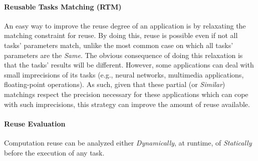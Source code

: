 
\paragraph{Reusable Tasks Matching (RTM)}

An easy way to improve the reuse degree of an application is by relaxating the matching constraint for reuse. By doing this, reuse is possible even if not all tasks' parameters match, unlike the most common case on which all tasks' parameters are the {\it Same}. The obvious consequence of doing this relaxation is that the tasks' results will be different. However, some applications can deal with small imprecisions of its tasks (e.g., neural networks, multimedia applications, floating-point operations). As such, given that these partial (or {\it Similar}) matchings respect the precision necessary for these applications which can cope with such imprecisions, this strategy can improve the amount of reuse available.



\paragraph{Reuse Evaluation}

Computation reuse can be analyzed either {\it Dynamically}, at runtime, of {\it Statically} before the execution of any task. 


